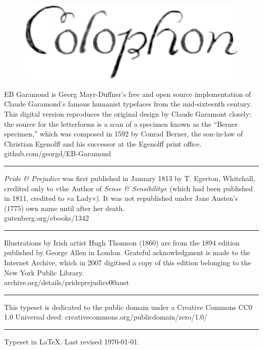 \documentclass[
paper=5.5in:8.5in,
BCOR=7mm,
twoside,
DIV=calc,
11pt,
usegeometry,
chapterprefix,
headings=big,
numbers=noenddot,
listof=flat,
listof=nochaptergap]{scrbook}
\begin{document}
\centering

\begin{figure}[t!]
\centering
\includegraphics[width=.4\linewidth]{colophon}
\end{figure}
\vspace{-2cm}

EB Garamond is Georg Mayr-Duffner's free and open source implementation of Claude Garamond’s famous humanist typefaces from the mid-sixteenth century. This digital version reproduces the original design by Claude Garamont closely: the source for the letterforms is a scan of a specimen known as the \enquote{Berner specimen,} which was composed in 1592 by Conrad Berner, the son-in-law of Christian Egenolff and his successor at the Egenolff print office.  \\github.com/georgd/EB-Garamond

\rule{0.5\textwidth}{.4pt}

\textit{Pride \& Prejudice} was first published in January 1813 by T. Egerton, Whitehall, credited only to »the Author of \textit{Sense \& Sensibility}« (which had been published in 1811, credited to »a Lady«). It was not republished under Jane Austen's (1775) own name until after her death.\\gutenberg.org/ebooks/1342

\rule{0.5\textwidth}{.4pt}

Illustrations by Irish artist Hugh Thomson (1860) are from the 1894 edition published by George Allen in London. Grateful acknowledgment is made to the Internet Archive, which in 2007 digitised a copy of this edition belonging to the New York Public Library.\\archive.org/details/prideprejudice00aust

\rule{0.5\textwidth}{.4pt}

This typeset is dedicated to the public domain under a Creative Commons CC0 1.0 Universal deed: creativecommons.org/publicdomain/zero/1.0/\\

\rule{0.5\textwidth}{.4pt}

Typeset in \LaTeX{}. Last revised \today.
\thispagestyle{empty}
\end{document}
